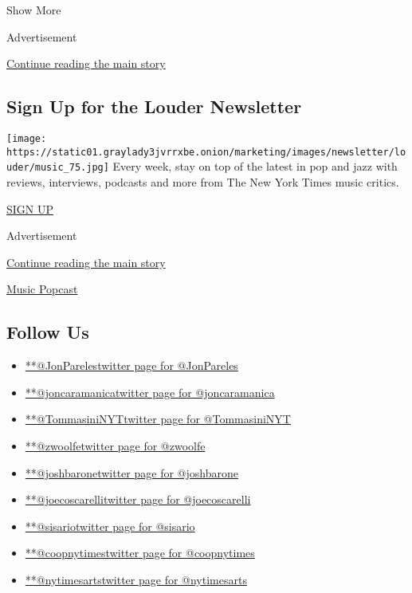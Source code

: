 Show More

Advertisement

\protect\hyperlink{after-mid2}{Continue reading the main story}

\hypertarget{sign-up-for-the-louder-newsletter}{%
\subsection{Sign Up for the Louder
Newsletter}\label{sign-up-for-the-louder-newsletter}}

\texttt{[image: https://static01.graylady3jvrrxbe.onion/marketing/images/newsletter/louder/music\_75.jpg]}
Every week, stay on top of the latest in pop and jazz with reviews,
interviews, podcasts and more from The New York Times music critics.

\href{/newsletters/signup/MS}{SIGN UP}

Advertisement

\protect\hyperlink{after-mktg}{Continue reading the main story}

\href{http://www.nytimes3xbfgragh.onion/column/popcast-pop-music-podcast}{Music
Popcast}

\hypertarget{follow-us}{%
\subsection{Follow Us}\label{follow-us}}

\begin{itemize}
\tightlist
\item
  \href{https://twitter.com/JonPareles}{**@JonParelestwitter page for
  @JonPareles}
\item
  \href{https://twitter.com/joncaramanica}{**@joncaramanicatwitter page
  for @joncaramanica}
\item
  \href{https://twitter.com/TommasiniNYT}{**@TommasiniNYTtwitter page
  for @TommasiniNYT}
\item
  \href{https://twitter.com/zwoolfe}{**@zwoolfetwitter page for
  @zwoolfe}
\item
  \href{https://twitter.com/joshbarone}{**@joshbaronetwitter page for
  @joshbarone}
\item
  \href{https://twitter.com/joecoscarelli}{**@joecoscarellitwitter page
  for @joecoscarelli}
\item
  \href{https://twitter.com/sisario}{**@sisariotwitter page for
  @sisario}
\item
  \href{https://twitter.com/coopnytimes}{**@coopnytimestwitter page for
  @coopnytimes}
\item
  \href{https://twitter.com/nytimesarts}{**@nytimesartstwitter page for
  @nytimesarts}
\end{itemize}

